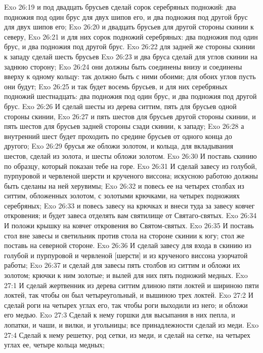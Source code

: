 Exo 26:19  и под двадцать брусьев сделай сорок серебряных подножий: два подножия под один брус для двух шипов его, и два подножия под другой брус для двух шипов его;
Exo 26:20  и двадцать брусьев для другой стороны скинии к северу,
Exo 26:21  и для них сорок подножий серебряных: два подножия под один брус, и два подножия под другой брус.
Exo 26:22  для задней же стороны скинии к западу сделай шесть брусьев
Exo 26:23  и два бруса сделай для углов скинии на заднюю сторону;
Exo 26:24  они должны быть соединены внизу и соединены вверху к одному кольцу: так должно быть с ними обоими; для обоих углов пусть они будут;
Exo 26:25  и так будет восемь брусьев, и для них серебряных подножий шестнадцать: два подножия под один брус, и два подножия под другой брус.
Exo 26:26  И сделай шесты из дерева ситтим, пять для брусьев одной стороны скинии,
Exo 26:27  и пять шестов для брусьев другой стороны скинии, и пять шестов для брусьев задней стороны сзади скинии, к западу;
Exo 26:28  а внутренний шест будет проходить по средине брусьев от одного конца до другого;
Exo 26:29  брусья же обложи золотом, и кольца, для вкладывания шестов, сделай из золота, и шесты обложи золотом.
Exo 26:30  И поставь скинию по образцу, который показан тебе на горе.
Exo 26:31  И сделай завесу из голубой, пурпуровой и червленой шерсти и крученого виссона; искусною работою должны быть сделаны на ней херувимы;
Exo 26:32  и повесь ее на четырех столбах из ситтим, обложенных золотом, с золотыми крючками, на четырех подножиях серебряных;
Exo 26:33  и повесь завесу на крючках и внеси туда за завесу ковчег откровения; и будет завеса отделять вам святилище от Святаго-святых.
Exo 26:34  И положи крышку на ковчег откровения во Святом-святых.
Exo 26:35  И поставь стол вне завесы и светильник против стола на стороне скинии к югу; стол же поставь на северной стороне.
Exo 26:36  И сделай завесу для входа в скинию из голубой и пурпуровой и червленой [шерсти] и из крученого виссона узорчатой работы;
Exo 26:37  и сделай для завесы пять столбов из ситтим и обложи их золотом; крючки к ним золотые; и вылей для них пять подножий медных.
Exo 27:1  И сделай жертвенник из дерева ситтим длиною пяти локтей и шириною пяти локтей, так чтобы он был четыреугольный, и вышиною трех локтей.
Exo 27:2  И сделай роги на четырех углах его, так чтобы роги выходили из него; и обложи его медью.
Exo 27:3  Сделай к нему горшки для высыпания в них пепла, и лопатки, и чаши, и вилки, и угольницы; все принадлежности сделай из меди.
Exo 27:4  Сделай к нему решетку, род сетки, из меди, и сделай на сетке, на четырех углах ее, четыре кольца медных;
